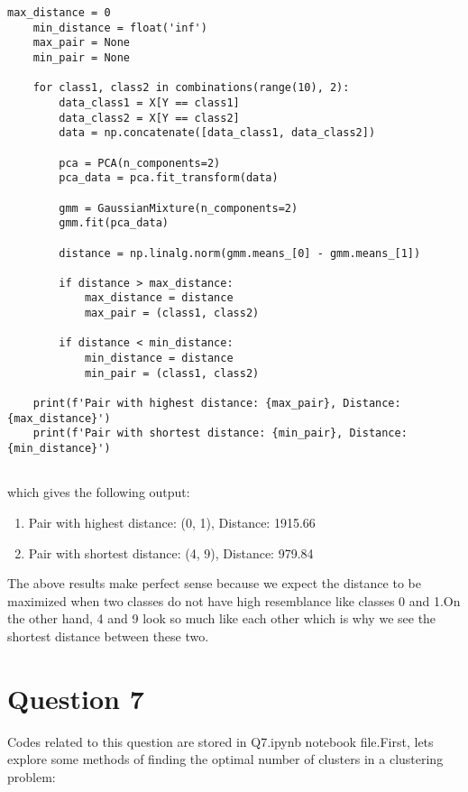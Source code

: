\documentclass{article}
\begin{document}
\begin{lstlisting}[style=mystyle]
    max_distance = 0
    min_distance = float('inf')
    max_pair = None
    min_pair = None
    
    for class1, class2 in combinations(range(10), 2):
        data_class1 = X[Y == class1]
        data_class2 = X[Y == class2]
        data = np.concatenate([data_class1, data_class2])
        
        pca = PCA(n_components=2)
        pca_data = pca.fit_transform(data)
        
        gmm = GaussianMixture(n_components=2)
        gmm.fit(pca_data)
        
        distance = np.linalg.norm(gmm.means_[0] - gmm.means_[1])
        
        if distance > max_distance:
            max_distance = distance
            max_pair = (class1, class2)
        
        if distance < min_distance:
            min_distance = distance
            min_pair = (class1, class2)
    
    print(f'Pair with highest distance: {max_pair}, Distance: {max_distance}')
    print(f'Pair with shortest distance: {min_pair}, Distance: {min_distance}')
    
\end{lstlisting}

which gives the following output:

\begin{enumerate}
    \item Pair with highest distance: (0, 1), Distance: 1915.66
    \item Pair with shortest distance: (4, 9), Distance: 979.84
\end{enumerate}

The above results make perfect sense because we expect the distance to be maximized when two classes do not have high resemblance like classes
0 and 1.On the other hand, 4 and 9 look so much like each other which is why we see the shortest distance between these two.

\section*{Question 7}
Codes related to this question are stored in Q7.ipynb notebook file.First, lets explore some methods of finding the optimal number of clusters
in a clustering problem:
\end{document}
